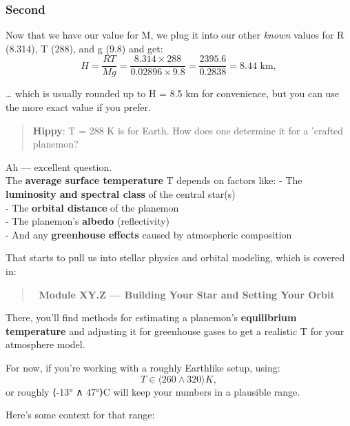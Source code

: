 \documentclass[
  letterpaper,
]{book}
\begin{document}
\subsubsection{Second}\label{second}

Now that we have our value for M, we plug it into our other \emph{known}
values for R (8.314), T (288), and g (9.8) and get: \[
H=\dfrac{R T}{M g} = \dfrac{8.314 \times 288}{0.02896 \times 9.8} = \dfrac{2395.6}{0.2838} = 8.44\text{ km},
\]

\ldots{} which is usually rounded up to H = 8.5 km for convenience, but
you can use the more exact value if you prefer.

\begin{quote}
\textbf{Hippy}: T = 288 K is for Earth. How does one determine it for a
'crafted planemon?
\end{quote}

Ah --- excellent question.\\
The \textbf{average surface temperature} T depends on factors like: -
The \textbf{luminosity and spectral class} of the central star(s)\\
- The \textbf{orbital distance} of the planemon\\
- The planemon's \textbf{albedo} (reflectivity)\\
- And any \textbf{greenhouse effects} caused by atmospheric composition

That starts to pull us into stellar physics and orbital modeling, which
is covered in:

\begin{quote}
🔗 \textbf{Module XY.Z --- Building Your Star and Setting Your Orbit}
\end{quote}

There, you'll find methods for estimating a planemon's
\textbf{equilibrium temperature} and adjusting it for greenhouse gases
to get a realistic T for your atmosphere model.

For now, if you're working with a roughly Earthlike setup, using: \[
T ∈ \langle260 \wedge 320\rangle K,
\] or roughly ⟨-13° ∧ 47°⟩C will keep your numbers in a plausible range.

Here's some context for that range:
\end{document}
